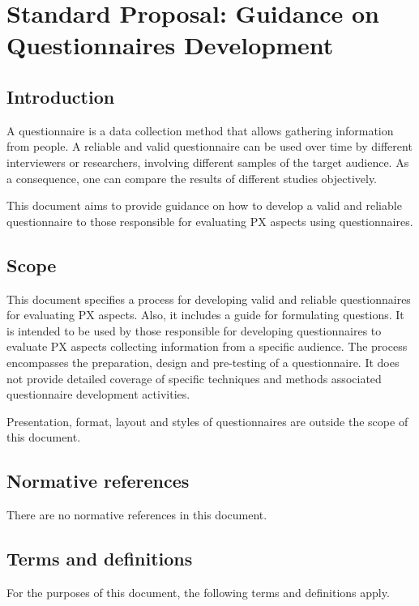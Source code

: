 \section{Standard Proposal: Guidance on Questionnaires Development} %

\label{sec:sta_proposal}

\subsection{Introduction}
A questionnaire is a data collection method that allows gathering information from people. A reliable and valid questionnaire can be used over time by different interviewers or researchers, involving different samples of the target audience. As a consequence, one can compare the results of different studies objectively.

This document aims to provide guidance on how to develop a valid and reliable questionnaire to those responsible for evaluating \ac{PX} aspects using questionnaires.

\subsection{Scope}

This document specifies a process for developing valid and reliable questionnaires for evaluating \ac{PX} aspects. Also, it includes a guide for formulating questions. It is intended to be used by those responsible for developing questionnaires to evaluate \ac{PX} aspects collecting information from a specific audience. The process encompasses the preparation, design and pre-testing of a questionnaire. It does not provide detailed coverage of specific techniques and methods associated questionnaire development activities.

Presentation, format, layout and styles of questionnaires are outside the scope of this document.

\subsection{Normative references}
There are no normative references in this document.

\subsection{Terms and definitions}
For the purposes of this document, the following terms and definitions apply.

